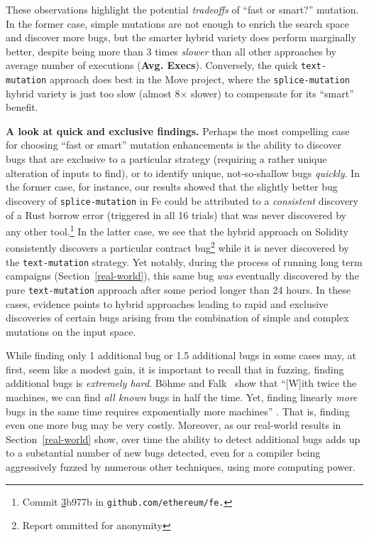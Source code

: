 \begin{sloppypar}
These observations highlight the potential \emph{tradeoffs} of ``fast or
smart?'' mutation. In the former case, simple mutations are not enough to
enrich the search space and discover more bugs, but the smarter hybrid variety
does perform marginally better, despite being more than 3 times \emph{slower}
than all other approaches by average number of executions (\textbf{Avg.
Execs}). Conversely, the quick \texttt{text-mutation} approach does best in the
Move project, where the \texttt{splice-mutation} hybrid variety is just too
slow (almost 8$\times$ slower) to compensate for its ``smart''
benefit.
\end{sloppypar}

\textbf{A look at quick and exclusive findings.} Perhaps the most compelling
case for choosing ``fast or smart'' mutation enhancements is the ability to
discover bugs that are exclusive to a particular strategy (requiring a rather
unique alteration of inputs to find), or to identify unique,
not-so-shallow bugs \emph{quickly}. In the former case, for instance, our results
showed that the slightly better bug discovery of \texttt{splice-mutation} in Fe
could be attributed to a \emph{consistent} discovery of a Rust borrow error
(triggered in all 16 trials) that was never discovered by any other
tool.\footnote{Commit
\href{https://github.com/ethereum/fe/commit/3b977b3078eb163ba521f57d8509e16efdb9dbf4}
3b977b in \texttt{github.com/ethereum/fe.}} In the latter case, we see that the
hybrid approach on Solidity consistently discovers a particular contract
bug\footnote{Report ommitted for anonymity} while it is never discovered by the
\texttt{text-mutation} strategy. Yet notably, during the process of running long
term campaigns (Section~\ref{real-world}), this same bug \emph{was} eventually discovered by the pure
\texttt{text-mutation} approach after some period longer than 24 hours.
In these cases, evidence points to hybrid approaches leading to rapid and
exclusive discoveries of certain bugs arising from the combination of simple
and complex mutations on the input space.

While finding only 1 additional bug or 1.5 additional bugs in some cases may,
at first, seem like a modest gain, it is important to recall that in fuzzing,
finding additional bugs is \emph{extremely hard}.  B\"{o}hme and
Falk~\cite{fuzzexp} show that ``[W]ith twice the machines, we can find
\emph{all known} bugs in half the time. Yet, finding linearly \emph{more} bugs
in the same time requires exponentially more machines'' \cite{fuzzexp}.  That
is, finding even one more bug may be very costly.  Moreover, as our real-world
results in Section~\ref{real-world} show, over time the ability to detect
additional bugs adds up to a substantial number of new bugs detected, even for
a compiler being aggressively fuzzed by numerous other techniques, using more
computing power.

